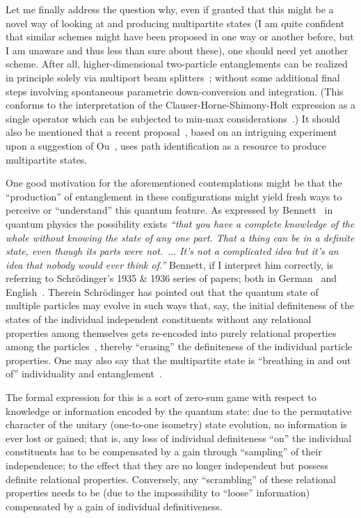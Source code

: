 \documentclass[%
  twocolumn,
 showpacs,
 showkeys,
 preprintnumbers,
 amsmath,amssymb,
 aps,
  pra,
  longbibliography,
 floatfix,
 ]{revtex4-1}
\begin{document}
Let me finally address the question why, even if granted that this might be a novel way of looking at and producing multipartite states
(I am quite confident that similar schemes might have been proposed in one way or another before, but I am unaware and thus less than sure about these),
one should need yet another scheme.
After all, higher-dimensional two-particle entanglements can be realized in principle solely via multiport beam splitters~\cite{zukowski-97};
without some additional final steps involving
spontaneous parametric down-conversion and integration.
(This conforms to the interpretation of the Clauser-Horne-Shimony-Holt expression as a single operator which can be
subjected to min-max considerations~\cite{filipp-svo-04-qpoly-prl}.)
It should also be mentioned that a recent proposal~\cite{PhysRevLett.118.080401}, based on an intriguing experiment~\cite{zou-wang-mandel:91a,zou-wang-mandel:91b}
upon a suggestion of Ou~\cite{ou-2007}, uses path identification as a resource to produce multipartite states.

One good motivation for the aforementioned contemplations might be that
the ``production'' of entanglement in these configurations
might yield fresh ways to perceive or ``understand'' this quantum feature.
As expressed by Bennett~\cite{Bennett-IBM-03.05.2016}
in quantum physics the possibility exists {\em ``that you have a complete knowledge
of the whole without knowing the state of any one part. That a thing can be in a definite
state, even though its parts were not.~$\ldots$
It's not a complicated idea but
it's an idea that nobody would ever think of.''}
Bennett, if I interpret him correctly, is referring to
Schr\"odinger's 1935 \& 1936 series of papers; both in German~\cite{schrodinger,schrodinger-en-10.2307/986572}
and English~\cite{CambridgeJournals:1737068,CambridgeJournals:2027212}.
Therein Schr\"odinger has pointed out that the quantum state of multiple particles may evolve in such ways that,
say,
the initial definiteness of the states of the individual independent constituents without any relational properties among themselves
gets re-encoded into purely relational properties among the particles~\cite{wootters-1990-localaccOQStates,mermin:753,Zeilinger-97,zeil-99},
thereby ``erasing'' the definiteness of the individual particle properties.
One may also say that the multipartite state is ``breathing in and out of'' individuality and entanglement~\cite{svozil-2016-pu-book}.

The formal expression for this is a sort of zero-sum game with respect to knowledge or information encoded by the quantum state:
due to the permutative character of the unitary (one-to-one isometry) state evolution, no information is ever lost or gained;
that is, any loss of individual definiteness ``on'' the individual constituents has to be compensated by a gain through
``sampling'' of their independence; to the effect that they are no longer independent but possess definite relational properties.
Conversely, any ``scrambling'' of these relational properties needs to be (due to the impossibility to ``loose'' information)
compensated by a gain of individual definitiveness.
\end{document}
